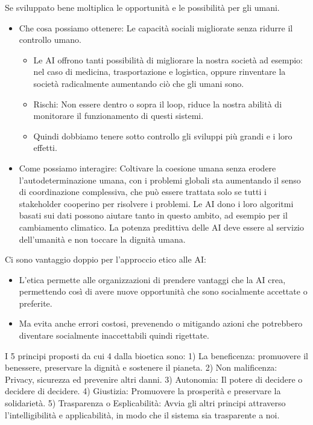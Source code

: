\documentclass[a4page, 11pt]{article}
\begin{document}
Se sviluppato bene moltiplica le opportunità e le possibilità per gli
umani.

\begin{itemize}
	\item
	Che cosa possiamo ottenere: Le capacità sociali migliorate senza
	ridurre il controllo umano.
	
	\begin{itemize}
		 
		\item
		Le AI offrono tanti possibilità di migliorare la nostra società ad
		esempio: nel caso di medicina, trasportazione e logistica, oppure
		rinventare la società radicalmente aumentando ciò che gli umani
		sono.
		\item
		Rischi: Non essere dentro o sopra il loop, riduce la nostra abilità
		di monitorare il funzionamento di questi sistemi.
		\item
		Quindi dobbiamo tenere sotto controllo gli sviluppi più grandi e i
		loro effetti.
	\end{itemize}
	\item
	Come possiamo interagire: Coltivare la coesione umana senza erodere
	l'autodeterminazione umana, con i problemi globali sta aumentando il
	senso di coordinazione complessiva, che può essere trattata solo se
	tutti i stakeholder cooperino per risolvere i problemi. Le AI dono i
	loro algoritmi basati sui dati possono aiutare tanto in questo ambito,
	ad esempio per il cambiamento climatico. La potenza predittiva delle
	AI deve essere al servizio dell'umanità e non toccare la dignità
	umana.
\end{itemize}

Ci sono vantaggio doppio per l'approccio etico alle AI:

\begin{itemize}
	 
	\item
	L'etica permette alle organizzazioni di prendere vantaggi che la AI
	crea, permettendo così di avere nuove opportunità che sono socialmente
	accettate o preferite.
	\item
	Ma evita anche errori costosi, prevenendo o mitigando azioni che
	potrebbero diventare socialmente inaccettabili quindi rigettate.
\end{itemize}

I 5 principi proposti da cui 4 dalla bioetica sono: 1) La beneficenza:
promuovere il benessere, preservare la dignità e sostenere il pianeta.
2) Non malificenza: Privacy, sicurezza ed prevenire altri danni. 3)
Autonomia: Il potere di decidere o decidere di decidere. 4) Giustizia:
Promuovere la prosperità e preservare la solidarietà. 5) Trasparenza o
Esplicabilità: Avvia gli altri principi attraverso l'intelligibilità e
applicabilità, in modo che il sistema sia trasparente a noi.
\end{document}

